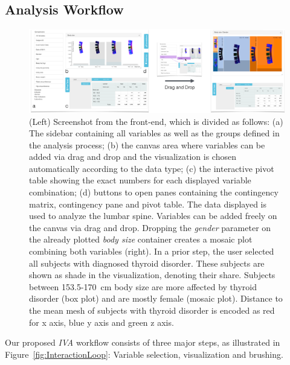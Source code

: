 \documentclass[journal]{style/vgtc} 			          %
\begin{document}
\subsection{Analysis Workflow}
\begin{figure}[htb]
 \centering
 \includegraphics[width=1\textwidth, resolution=300]{figures/visualization}
 \caption{
 (Left) Screenshot from the front-end, which is divided as follows: (a) The sidebar containing all variables as well as the groups defined in the analysis process; (b) the canvas area where variables can be added via drag and drop and the visualization is chosen automatically according to the data type; (c) the interactive pivot table showing the exact numbers for each displayed variable combination; (d) buttons to open panes containing the contingency matrix, contingency pane and pivot table.
 The data displayed is used to analyze the lumbar spine. Variables can be added freely on the canvas via drag and drop.
 Dropping the \emph{gender} parameter on the already plotted \emph{body size} container creates a mosaic plot combining both variables (right).
 In a prior step, the user selected all subjects with diagnosed thyroid disorder.
 These subjects are shown as shade in the visualization, denoting their share.
 Subjects between 153.5-170~cm body size are more affected by thyroid disorder (box plot) and are mostly female (mosaic plot).
 Distance to the mean mesh of subjects with thyroid disorder is encoded as red for x axis, blue y axis and green z axis.
 }
 \label{fig:visualization}
\end{figure}
Our proposed \emph{IVA} workflow consists of three major steps, as illustrated in Figure~\ref{fig:InteractionLoop}: Variable selection, visualization and brushing.
\end{document}
